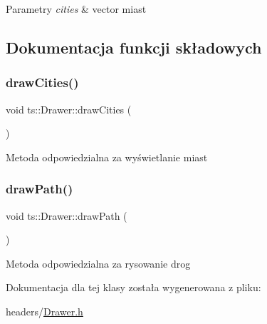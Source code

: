 \begin{DoxyParams}{Parametry}
{\em cities} & vector miast \\
\hline
\end{DoxyParams}


\subsection{Dokumentacja funkcji składowych}
\mbox{\label{classts_1_1_drawer_a746a12f5e8693ea4aca8db7b91e89b32}} 
\subsubsection{\texorpdfstring{draw\+Cities()}{drawCities()}}
{\footnotesize\ttfamily void ts\+::\+Drawer\+::draw\+Cities (\begin{DoxyParamCaption}{ }\end{DoxyParamCaption})}

Metoda odpowiedzialna za wyświetlanie miast \mbox{\label{classts_1_1_drawer_a5df30e090e866aca17986fbd5e518fc3}} 
\subsubsection{\texorpdfstring{draw\+Path()}{drawPath()}}
{\footnotesize\ttfamily void ts\+::\+Drawer\+::draw\+Path (\begin{DoxyParamCaption}{ }\end{DoxyParamCaption})}

Metoda odpowiedzialna za rysowanie drog 

Dokumentacja dla tej klasy została wygenerowana z pliku\+:\begin{DoxyCompactItemize}
\item 
headers/\mbox{\hyperlink{_drawer_8h}{Drawer.\+h}}\end{DoxyCompactItemize}
